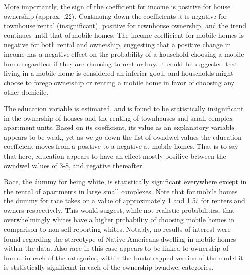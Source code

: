 \documentclass{article}
\begin{document}
 More importantly, the sign of the coefficient for income is positive for house ownership (approx. .22).  Continuing down the coefficients it is negative for townhouse rental (insignificant), positive for townhouse ownership, and the trend continues until that of mobile homes.  The income coefficient for mobile homes is negative for both rental and ownership, suggesting that a positive change in income has a negative effect on the probability of a household choosing a mobile home regardless if they are choosing to rent or buy.  It could be suggested that living in a mobile home is considered an inferior good, and households might choose to forego ownership or renting a mobile home in favor of choosing any other domicile.
 
The education variable is estimated, and is found to be statistically insignificant in the ownership of houses and the renting of townhouses and small complex apartment units.  Based on its coefficient, its value as an explanatory variable appears to be weak, yet as we go down the list of owndwel values the education coefficient moves from a positive to a negative at mobile homes. That is to say that here, education appears to have an effect mostly positive between the owndwel values of 3-8, and negative thereafter.

Race, the dummy for being white, is statistically significant everywhere except in the rental of apartments in large small complexes.  Note that for mobile homes the dummy for race takes on a value of approximately 1 and 1.57 for renters and owners respectively.  This would suggest, while not realistic probabilities, that overwhelmingly whites have a higher probability of choosing mobile homes in comparison to non-self-reporting whites.  Notably, no results of interest were found regarding the stereotype of Native-Americans dwelling in mobile homes within the data.  Also race in this case appears to be linked to ownership of homes in each of the categories, within the bootstrapped version of the model it is statistically significant in each of the ownership owndwel categories.  

\end{document}
